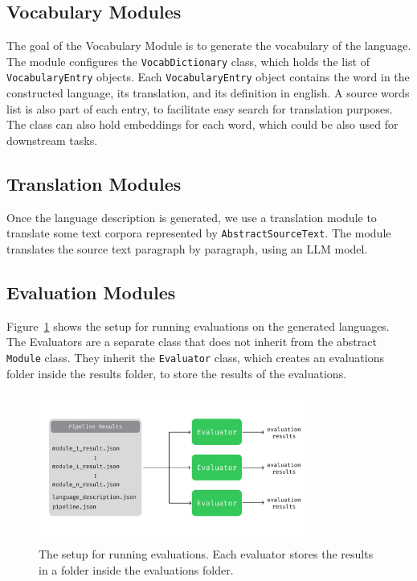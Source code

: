 \subsection{Vocabulary Modules}
The goal of the Vocabulary Module is to generate the vocabulary of the language. The module configures the \texttt{VocabDictionary} class, which
holds the list of \texttt{VocabularyEntry} objects. Each \texttt{VocabularyEntry} object contains the word in the constructed language, its translation,
and its definition in english. 
A source words list is also part of each entry, to facilitate easy search for translation purposes. The class can also hold embeddings for each word, which could be also used for downstream tasks.

\subsection{Translation Modules}
Once the language description is generated, we use a translation module to translate some text corpora represented by \texttt{AbstractSourceText}.
The module translates the source text paragraph by paragraph, using an LLM model.

\subsection{Evaluation Modules}
Figure~\ref{fig:evaluations_structure} shows the setup for running evaluations on the generated languages. The Evaluators are a separate class 
that does not inherit from the abstract \texttt{Module} class. They inherit the \texttt{Evaluator} class, which creates an evaluations folder 
inside the results folder, to store the results of the evaluations. 

\begin{figure}
    \centering
    \includegraphics[width=0.8\textwidth]{figures/evaluations_structure.png}
    \caption{The setup for running evaluations. Each evaluator stores the results in a folder inside the evaluations folder.}
    \label{fig:evaluations_structure}
\end{figure}